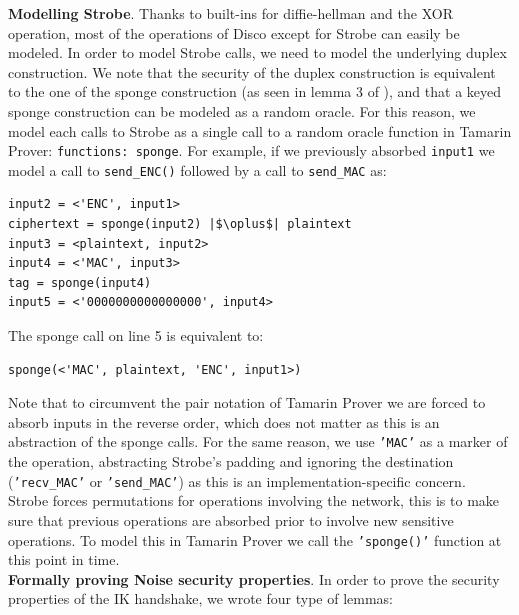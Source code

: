 \documentclass{article}
\begin{document}
\textbf{Modelling Strobe}. Thanks to built-ins for diffie-hellman and the XOR operation, most of the operations of Disco except for Strobe can easily be modeled. In order to model Strobe calls, we need to model the underlying duplex construction. We note that the security of the duplex construction is equivalent to the one of the sponge construction (as seen in lemma 3 of \cite{spongeduplex}), and that a keyed sponge construction can be modeled as a random oracle\cite{keyedsponge}. For this reason, we model each calls to Strobe as a single call to a random oracle function in Tamarin Prover: \texttt{functions: sponge\1}. For example, if we previously absorbed \texttt{input1} we model a call to \texttt{send_ENC()} followed by a call to \texttt{send_MAC} as:

\begin{verbatim}
input2 = <'ENC', input1>
ciphertext = sponge(input2) |$\oplus$| plaintext
input3 = <plaintext, input2>
input4 = <'MAC', input3>
tag = sponge(input4)
input5 = <'0000000000000000', input4>
\end{verbatim}

The sponge call on line 5 is equivalent to:

\begin{verbatim}
sponge(<'MAC', plaintext, 'ENC', input1>)
\end{verbatim}

Note that to circumvent the pair notation of Tamarin Prover we are forced to absorb inputs in the reverse order, which does not matter as this is an abstraction of the sponge calls. For the same reason, we use \texttt{'MAC'} as a marker of the operation, abstracting Strobe's padding and ignoring the destination (\texttt{'recv_MAC'} or \texttt{'send_MAC'}) as this is an implementation-specific concern.\\

Strobe forces permutations for operations involving the network, this is to make sure that previous operations are absorbed prior to involve new sensitive operations. To model this in Tamarin Prover we call the \texttt{'sponge()'} function at this point in time.\\

\textbf{Formally proving Noise security properties}. In order to prove the security properties of the IK handshake, we wrote four type of lemmas:
\end{document}
